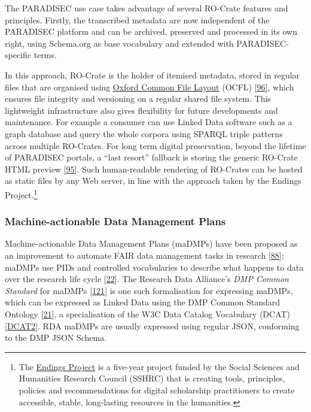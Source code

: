 The PARADISEC use case takes advantage of several RO-Crate features and
principles. Firstly, the transcribed metadata are now independent of the
PARADISEC platform and can be archived, preserved and processed in its
own right, using Schema.org as base vocabulary and extended with
PARADISEC-specific terms.

In this approach, RO-Crate is the holder of itemised metadata, stored in
regular files that are organised using
\href{https://ocfl.io/1.0/spec/}{Oxford Common File Layout} (OCFL)
\href{https://ocfl.io/1.0/spec/}{{[}96{]}}, which ensures file integrity
and versioning on a regular shared file system. This lightweight
infrastructure also gives flexibility for future developments and
maintenance. For example a consumer can use Linked Data software such as
a graph database and query the whole corpora using SPARQL triple
patterns across multiple RO-Crates. For long term digital preservation,
beyond the lifetime of PARADISEC portals, a ``last resort'' fallback is
storing the generic RO-Crate HTML preview
\href{https://www.npmjs.com/package/ro-crate-html-js}{{[}95{]}}. Such
human-readable rendering of RO-Crates can be hosted as static files by
any Web server, in line with the approach taken by the Endings
Project.\footnote{The \href{https://endings.uvic.ca/}{Endings Project}
  is a five-year project funded by the Social Sciences and Humanities
  Research Council (SSHRC) that is creating tools, principles, policies
  and recommendations for digital scholarship practitioners to create
  accessible, stable, long-lasting resources in the humanities.}

\hypertarget{dmp}{%
\subsubsection{Machine-actionable Data Management Plans}\label{dmp}}

Machine-actionable Data Management Plans (maDMPs) have been proposed as
an improvement to automate FAIR data management tasks in research
{[}\href{https://doi.org/10.1371/journal.pcbi.1006750}{88}{]}; maDMPs
use PIDs and controlled vocabularies to describe what happens to data
over the research life cycle
{[}\href{https://doi.org/10.1007/978-3-030-45442-5_15}{22}{]}. The
Research Data Alliance's \emph{DMP Common Standard} for maDMPs
{[}\href{https://doi.org/10.15497/rda00039}{121}{]} is one such
formalisation for expressing maDMPs, which can be expressed as Linked
Data using the DMP Common Standard Ontology
{[}\href{https://doi.org/10.4126/frl01-006423289}{21}{]}, a
specialisation of the W3C Data Catalog Vocabulary (DCAT)
\href{https://www.w3.org/TR/2020/REC-vocab-dcat-2-20200204/}{{[}DCAT2{]}}.
RDA maDMPs are usually expressed using regular JSON, conforming to the
DMP JSON Schema.

